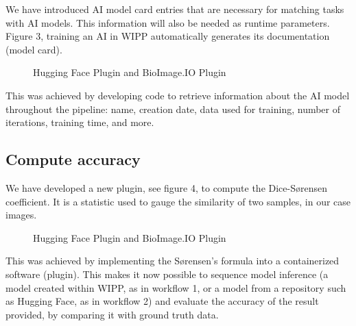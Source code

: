 We have introduced AI model card entries that are necessary for matching tasks
with AI models. This information will also be needed as runtime parameters.
Figure 3, training an AI in WIPP automatically generates its documentation
(model card).

\begin{figure}[H]
  \centering
  \fbox{\rule{0pt}{2in} \rule{0.9\linewidth}{0pt}}

   \caption{Hugging Face Plugin and BioImage.IO Plugin}
   \label{fig:onecol}
\end{figure}

This was achieved by developing code to retrieve information about the AI model
throughout the pipeline: name, creation date, data used for training, number of
iterations, training time, and more.

\subsection{Compute accuracy}

We have developed a new plugin, see figure 4, to compute the Dice-Sørensen
coefficient. It is a statistic used to gauge the similarity of two samples, in
our case images.

\begin{figure}[H]
  \centering
  \fbox{\rule{0pt}{2in} \rule{0.9\linewidth}{0pt}}

   \caption{Hugging Face Plugin and BioImage.IO Plugin}
   \label{fig:onecol}
\end{figure}

This was achieved by implementing the Sørensen's formula into a containerized
software (plugin). This makes it now possible to sequence model inference (a
model created within WIPP, as in workflow 1, or a model from a repository such
as Hugging Face, as in workflow 2) and evaluate the accuracy of the result
provided, by comparing it with ground truth data.
